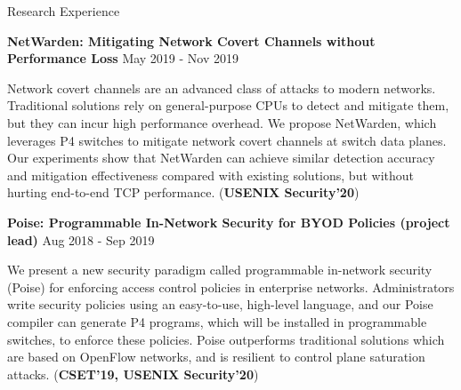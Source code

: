 \documentclass{resume} %
\begin{document}
\begin{rSection}{Research Experience}
\item {\bf NetWarden: Mitigating Network Covert Channels without Performance Loss} \hfill { May 2019 - Nov 2019}

Network covert channels are an advanced class of attacks to modern networks.
Traditional solutions rely on general-purpose CPUs to detect and mitigate them,
but they can incur high performance overhead.
We propose NetWarden, which leverages P4 switches to mitigate network covert channels
at switch data planes.
Our experiments show that NetWarden can achieve similar detection accuracy and mitigation
effectiveness compared with existing solutions, but without hurting end-to-end TCP performance.
({\bf USENIX Security'20})

\vspace{3mm}

\item {\bf Poise: Programmable In-Network Security for BYOD Policies (project lead)} \hfill { Aug 2018 - Sep 2019}

We present a new security paradigm called programmable in-network security (Poise) for
enforcing access control policies in enterprise networks.
Administrators write security policies using an easy-to-use, high-level language,
and our Poise compiler can generate P4 programs, which will be installed in programmable switches,
to enforce these policies.
Poise outperforms traditional solutions which are based on OpenFlow networks, and
is resilient to control plane saturation attacks.
({\bf CSET'19, USENIX Security'20})

\vspace{2mm}

\end{rSection}
\end{document}
